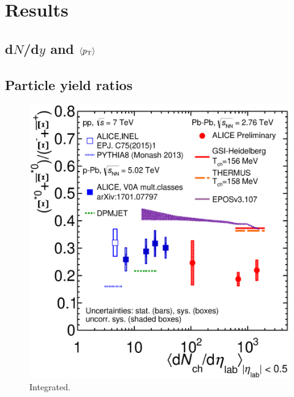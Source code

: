 \section{Results}
\subsection{d$N$/d$y$ and $\langle p_{\mathrm{T}}\rangle$}
\subsection{Particle yield ratios}


\begin{figure}[htbp]
\begin{center}
\includegraphics[width=12.cm]{./Version1/FigChapter6/Ratio_XiStarToXi}
\caption{Integrated.}
\label{fig:xitoxi}
\end{center}
\end{figure}

